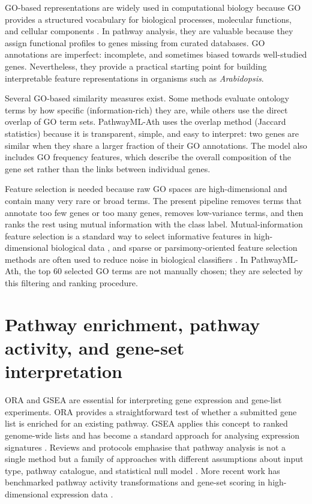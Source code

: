 \documentclass[12pt,letterpaper,oneside,openany]{book}
\begin{document}
GO-based representations are widely used in computational biology because GO provides a structured vocabulary for biological processes, molecular functions, and cellular components \citep{ashburner2000gene,geneontology2023}. In pathway analysis, they are valuable because they assign functional profiles to genes missing from curated databases. GO annotations are imperfect: incomplete, and sometimes biased towards well-studied genes. Nevertheless, they provide a practical starting point for building interpretable feature representations in organisms such as \textit{Arabidopsis}.

Several GO-based similarity measures exist. Some methods evaluate ontology terms by how specific (information-rich) they are, while others use the direct overlap of GO term sets. PathwayML-Ath uses the overlap method (Jaccard statistics) because it is transparent, simple, and easy to interpret: two genes are similar when they share a larger fraction of their GO annotations. The model also includes GO frequency features, which describe the overall composition of the gene set rather than the links between individual genes.

Feature selection is needed because raw GO spaces are high-dimensional and contain many very rare or broad terms. The present pipeline removes terms that annotate too few genes or too many genes, removes low-variance terms, and then ranks the rest using mutual information with the class label. Mutual-information feature selection is a standard way to select informative features in high-dimensional biological data \citep{dingpeng2003}, and sparse or parsimony-oriented feature selection methods are often used to reduce noise in biological classifiers \citep{tibshirani1996regression}. In PathwayML-Ath, the top 60 selected GO terms are not manually chosen; they are selected by this filtering and ranking procedure.

\section{Pathway enrichment, pathway activity, and gene-set interpretation}
\label{sec:lit_enrichment}

ORA and GSEA are essential for interpreting gene expression and gene-list experiments. ORA provides a straightforward test of whether a submitted gene list is enriched for an existing pathway. GSEA applies this concept to ranked genome-wide lists and has become a standard approach for analysing expression signatures \citep{subramanian2005gsea}. Reviews and protocols emphasise that pathway analysis is not a single method but a family of approaches with different assumptions about input type, pathway catalogue, and statistical null model \citep{khatri2012ten}. More recent work has benchmarked pathway activity transformations and gene-set scoring in high-dimensional expression data \citep{zhang2020pathway}.
\end{document}
